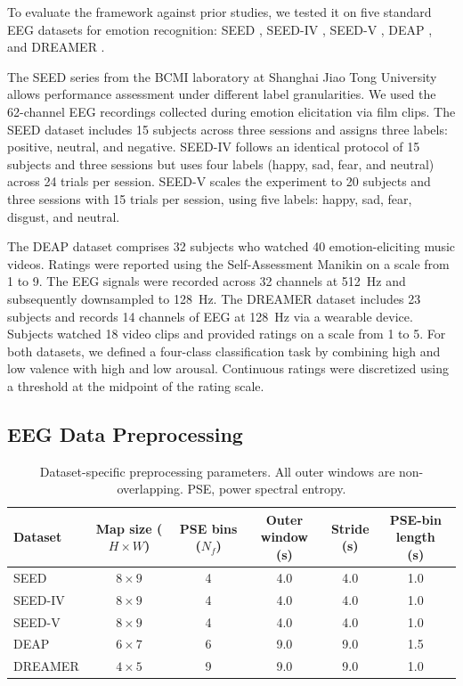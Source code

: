 ﻿\documentclass[12pt]{article}
\begin{document}
To evaluate the framework against prior studies, we tested it on five standard EEG datasets for emotion recognition: SEED \cite{ref65}, SEED-IV \cite{ref48}, SEED-V \cite{ref49}, DEAP \cite{ref50}, and DREAMER \cite{ref51}.

The SEED series from the BCMI laboratory at Shanghai Jiao Tong University allows performance assessment under different label granularities. We used the 62-channel EEG recordings collected during emotion elicitation via film clips. The SEED dataset includes 15 subjects across three sessions and assigns three labels: positive, neutral, and negative. SEED-IV follows an identical protocol of 15 subjects and three sessions but uses four labels (happy, sad, fear, and neutral) across 24 trials per session. SEED-V scales the experiment to 20 subjects and three sessions with 15 trials per session, using five labels: happy, sad, fear, disgust, and neutral.

The DEAP dataset comprises 32 subjects who watched 40 emotion-eliciting music videos. Ratings were reported using the Self-Assessment Manikin on a scale from 1 to 9. The EEG signals were recorded across 32 channels at 512~Hz and subsequently downsampled to 128~Hz. The DREAMER dataset includes 23 subjects and records 14 channels of EEG at 128~Hz via a wearable device. Subjects watched 18 video clips and provided ratings on a scale from 1 to 5. For both datasets, we defined a four-class classification task by combining high and low valence with high and low arousal. Continuous ratings were discretized using a threshold at the midpoint of the rating scale.

\subsection{EEG Data Preprocessing}\label{supp:preprocessing}
\begin{table}[h]
\centering
\caption{Dataset-specific preprocessing parameters. All outer windows are non-overlapping. PSE, power spectral entropy.}
\label{tab:preprocessing_params}
\vspace{2pt}
\footnotesize
\setlength{\tabcolsep}{3.5pt}
\begin{tabular}{@{}lccccc@{}}
\toprule
Dataset &
\makecell{Map size\\($H \times W$)} &
\makecell{PSE bins\\($N_f$)} &
\makecell{Outer window\\(s)} &
\makecell{Stride\\(s)} &
\makecell{PSE-bin length\\(s)} \\
\midrule
SEED      & $8 \times 9$ & 4 & 4.0 & 4.0 & 1.0 \\
SEED-IV   & $8 \times 9$ & 4 & 4.0 & 4.0 & 1.0 \\
SEED-V    & $8 \times 9$ & 4 & 4.0 & 4.0 & 1.0 \\
DEAP      & $6 \times 7$ & 6 & 9.0 & 9.0 & 1.5 \\
DREAMER   & $4 \times 5$ & 9 & 9.0 & 9.0 & 1.0 \\
\bottomrule
\end{tabular}
\end{table}
\end{document}

